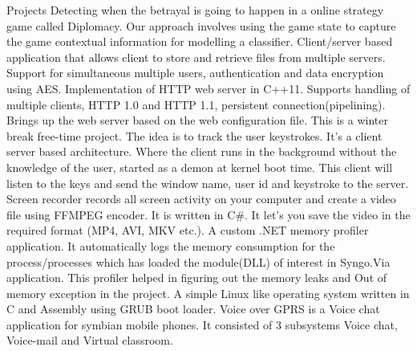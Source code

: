 \documentclass{resume}
\begin{document}
\begin{category}{Projects}
 Detecting when the betrayal is going to happen in a online strategy game called Diplomacy. Our approach involves using the game state to capture the game contextual information for modelling a classifier.
 Client/server based application that allows client to store and retrieve files from multiple servers. Support for simultaneous multiple users, authentication and data encryption using AES.
 Implementation of HTTP web server in C++11. Supports handling of multiple clients, HTTP 1.0 and HTTP 1.1, persistent connection(pipelining). Brings up the web server based on the web configuration file.
 This is a winter break free-time project. The idea is to track the user keystrokes. It's a client server based architecture. Where the client runs in the background without the knowledge of the user, started as a demon at kernel boot time. This client will listen to the keys and send the window name, user id and keystroke to the server.
 Screen recorder records all screen activity on your computer and create a video file using FFMPEG encoder. It is written in C\#. It let's you save the video in the required format (MP4, AVI, MKV etc.).
 A custom .NET memory profiler application. It automatically logs the memory consumption for the process/processes which has loaded the module(DLL) of interest in Syngo.Via application. This profiler helped in figuring out the memory leaks and Out of memory exception in the project.
 A simple Linux like operating system written in C and Assembly using GRUB boot loader.
 Voice over GPRS is a Voice chat application for symbian mobile phones. It consisted of 3 subsystems Voice chat, Voice-mail and Virtual classroom.
\end{category}
\end{document}
